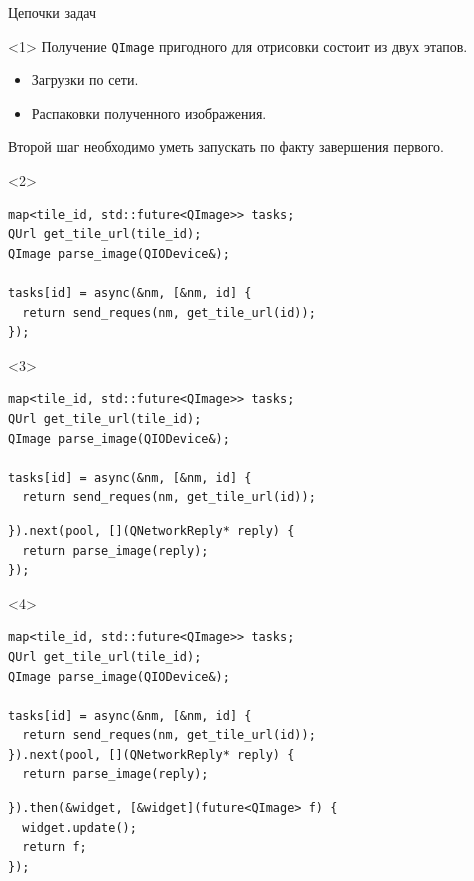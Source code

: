 \documentclass[aspectratio=169,hyperref={unicode},17pt]{beamer}
\begin{document}
\begin{frame}[fragile,t]{Цепочки задач}
\begin{onlyenv}<1>
Получение \texttt{QImage} пригодного для отрисовки состоит из двух этапов.
\begin{itemize}
 \item Загрузки по сети.
 \item Распаковки полученного изображения.
\end{itemize}
Второй шаг необходимо уметь запускать по факту завершения первого.
\end{onlyenv}
\begin{onlyenv}<2>
\begin{lstlisting}[style=cppcode,aboveskip=0pt,belowskip=0pt]
map<tile_id, std::future<QImage>> tasks;
QUrl get_tile_url(tile_id);
QImage parse_image(QIODevice&);

tasks[id] = async(&nm, [&nm, id] {
  return send_reques(nm, get_tile_url(id));
});
\end{lstlisting}
\end{onlyenv}
\begin{onlyenv}<3>
\begin{lstlisting}[style=cppcode,aboveskip=0pt,belowskip=0pt]
map<tile_id, std::future<QImage>> tasks;
QUrl get_tile_url(tile_id);
QImage parse_image(QIODevice&);

tasks[id] = async(&nm, [&nm, id] {
  return send_reques(nm, get_tile_url(id));
\end{lstlisting}
\begin{lstlisting}[style=cppcode,backgroundcolor=\color{gray!30},aboveskip=0pt,belowskip=0pt]
}).next(pool, [](QNetworkReply* reply) {
  return parse_image(reply);
});
\end{lstlisting}
\end{onlyenv}
\begin{onlyenv}<4>
\begin{lstlisting}[style=cppcode,aboveskip=0pt,belowskip=0pt]
map<tile_id, std::future<QImage>> tasks;
QUrl get_tile_url(tile_id);
QImage parse_image(QIODevice&);

tasks[id] = async(&nm, [&nm, id] {
  return send_reques(nm, get_tile_url(id));
}).next(pool, [](QNetworkReply* reply) {
  return parse_image(reply);
\end{lstlisting}
\begin{lstlisting}[style=cppcode,backgroundcolor=\color{gray!30},aboveskip=0pt,belowskip=0pt]
}).then(&widget, [&widget](future<QImage> f) {
  widget.update();
  return f;
});
\end{lstlisting}
\end{onlyenv}
\end{frame}
\end{document}
